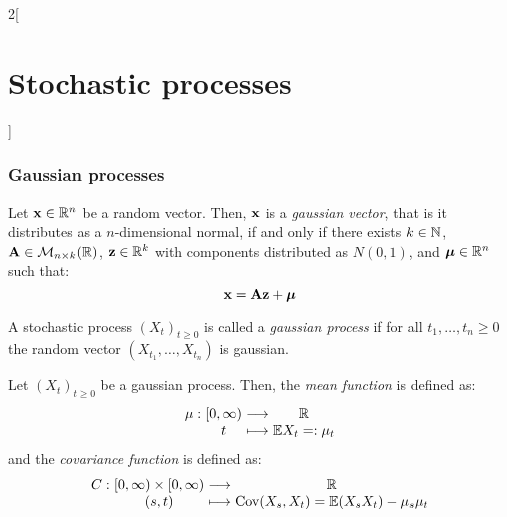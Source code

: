 \documentclass[../../../main_math.tex]{subfiles}
\begin{document}
\begin{multicols}{2}[\section{Stochastic processes}]
  \subsubsection{Gaussian processes}
  \begin{proposition}\label{SP:gaussian_vector}
    Let $\boldsymbol{\mathrm{x}}\in \mathbb{R}^n$ be a random vector. Then, $\boldsymbol{\mathrm{x}}$ is a \emph{gaussian vector}, that is it distributes as a $n$-dimensional normal, if and only if there exists $k\in\mathbb{N}$, $\boldsymbol{\mathrm{A}}\in\mathcal{M}_{n\times k}(\mathbb{R})$, $\boldsymbol{\mathrm{z}}\in\mathbb{R}^k$ with \iid components distributed as $N(0,1)$, and $\boldsymbol{\mathrm{\mu}}\in\mathbb{R}^n$ such that: $$\boldsymbol{\mathrm{x}}=\boldsymbol{\mathrm{A}}\boldsymbol{\mathrm{z}}+\boldsymbol{\mathrm{\mu}}$$
  \end{proposition}
  \begin{definition}
    A stochastic process ${(X_t)}_{t\geq 0}$ is called a \emph{gaussian process} if for all $t_1,\ldots,t_n\geq 0$ the random vector $(X_{t_1},\ldots,X_{t_n})$ is gaussian.
  \end{definition}
  \begin{definition}
    Let ${(X_t)}_{t\geq 0}$ be a gaussian process.
    Then, the \emph{mean function} is defined as:
    $$
      \function{\mu}{[0,\infty)}{\RR}{t}{\Exp{X_t}=:\mu_t}
    $$
    and the \emph{covariance function} is defined as:
    $$
      \function{C}{[0,\infty)\times[0,\infty)}{\RR}{(s,t)}{\cov(X_s,X_t)=\Exp(X_sX_t)-\mu_s\mu_t}
    $$
  \end{definition}

\end{multicols}
\end{document}
